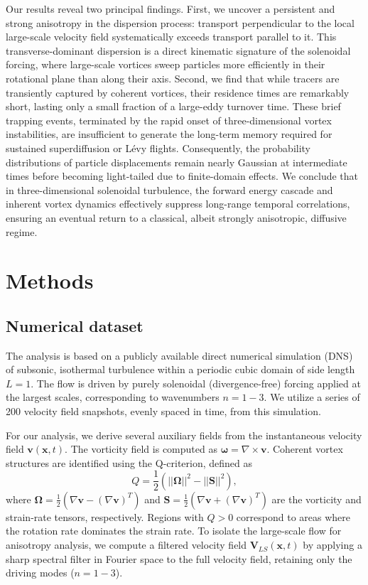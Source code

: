 \documentclass[]{article}
\begin{document}
Our results reveal two principal findings. First, we uncover a persistent and strong anisotropy in the dispersion process: transport perpendicular to the local large-scale velocity field systematically exceeds transport parallel to it. This transverse-dominant dispersion is a direct kinematic signature of the solenoidal forcing, where large-scale vortices sweep particles more efficiently in their rotational plane than along their axis. Second, we find that while tracers are transiently captured by coherent vortices, their residence times are remarkably short, lasting only a small fraction of a large-eddy turnover time. These brief trapping events, terminated by the rapid onset of three-dimensional vortex instabilities, are insufficient to generate the long-term memory required for sustained superdiffusion or Lévy flights. Consequently, the probability distributions of particle displacements remain nearly Gaussian at intermediate times before becoming light-tailed due to finite-domain effects. We conclude that in three-dimensional solenoidal turbulence, the forward energy cascade and inherent vortex dynamics effectively suppress long-range temporal correlations, ensuring an eventual return to a classical, albeit strongly anisotropic, diffusive regime.

\section{Methods}
\label{sec:methods}
\subsection{Numerical dataset}
The analysis is based on a publicly available direct numerical simulation (DNS) of subsonic, isothermal turbulence within a periodic cubic domain of side length $L=1$. The flow is driven by purely solenoidal (divergence-free) forcing applied at the largest scales, corresponding to wavenumbers $n=1-3$. We utilize a series of 200 velocity field snapshots, evenly spaced in time, from this simulation.

For our analysis, we derive several auxiliary fields from the instantaneous velocity field $\mathbf{v}(\mathbf{x}, t)$. The vorticity field is computed as $\boldsymbol{\omega} = \nabla \times \mathbf{v}$. Coherent vortex structures are identified using the Q-criterion, defined as
\begin{equation}
Q = \frac{1}{2} \left( ||\boldsymbol{\Omega}||^2 - ||\mathbf{S}||^2 \right),
\end{equation}
where $\boldsymbol{\Omega} = \frac{1}{2}(\nabla\mathbf{v} - (\nabla\mathbf{v})^T)$ and $\mathbf{S} = \frac{1}{2}(\nabla\mathbf{v} + (\nabla\mathbf{v})^T)$ are the vorticity and strain-rate tensors, respectively. Regions with $Q > 0$ correspond to areas where the rotation rate dominates the strain rate. To isolate the large-scale flow for anisotropy analysis, we compute a filtered velocity field $\mathbf{V}_{LS}(\mathbf{x}, t)$ by applying a sharp spectral filter in Fourier space to the full velocity field, retaining only the driving modes ($n=1-3$).
\end{document}
